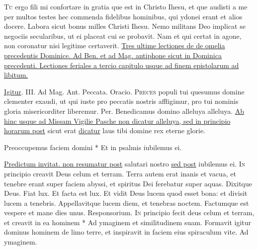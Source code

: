 \begin{multicols*}{2}
\lettrine[lines=2]{\zallmancaps \color{Blue} T}{u} ergo fili mi confortare in gratia que est in Christo Ihesu, et que audisti a me per multos testes hec commenda fidelibus hominibus, qui ydonei erant et alios docere. Labora sicut bonus milles Christi Ihesu. Nemo militans Deo implicat se negociis secularibus, ut ei placeat cui se probavit. Nam et qui certat in agone, non coronatur nisi legitime certaverit.
\newline \ul{Tres ultime lectiones de de omelia precedentis Dominice. Ad Ben. et ad Mag. antiphone sicut in Dominica precedenti. Lectiones feriales a tercio capitulo usque ad finem epistolarum ad libitum.}
{\color{Red} }
\par {} \R \hyperlink{igitur-perfecti}{Igitur}. {\color{Red} III. Ad Mag. Ant.} Peccata. {\color{Red} Oracio.} 
\lettrine[lines=2]{\zallmancaps \color{Red} P}{reces} populi tui quesumus domine clementer exaudi, ut qui iuste pro peccatis nostris affligimur, pro tui nominis gloria misericorditer liberemur. Per. Benedicamus domino alleluya alleluya.
\newline \ul{Ab hinc usque ad Missam Vigilie Pasche non dicatur alleluya, sed in principio horarum post} sicut erat \ul{dicatur} laus tibi domine rex eterne glorie.
\begin{invitatory}
{Preoccupemus faciem domini * Et in psalmis iubilemus ei.}
\end{invitatory}
\newline \ul{Predictum invitat. non resumatur post} salutari nostro \ul{sed post} iubilemus ei.
\lettrine[lines=2]{\zallmancaps \color{Blue} I}{n} principio creavit Deus celum et terram. Terra autem erat inanis et vacua, et tenebre erant super faciem abyssi, et spiritus Dei ferebatur super aquas. Dixitque Deus. Fiat lux. Et facta est lux. Et vidit Deus lucem quod esset bona: et divisit lucem a tenebris. Appellavitque lucem diem, et tenebras noctem. Factumque est vespere et mane dies unus. {\color{Red} Responsorium.}
\lettrine[lines=2]{\zallmancaps \color{Red} I}{n} \hypertarget{in-principio-fecit}{\label{in-principio-fecit}} principio fecit deus celum et terram, et creavit in ea hominem * Ad ymaginem et similitudinem suam. \V Formavit igitur dominus hominem de limo terre, et inspiravit in faciem eius spiraculum vite. Ad ymaginem.

\end{multicols*}
